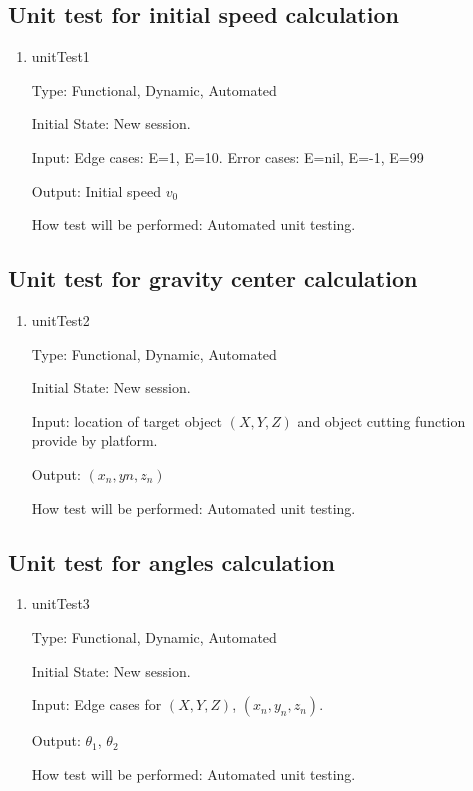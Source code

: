 \documentclass[12pt, titlepage]{article}
\begin{document}
\subsection{Unit test for initial speed calculation}

\begin{enumerate}
	
	\item{unitTest1\\}
	
	Type: Functional, Dynamic, Automated
	
	Initial State: New session.
	
	Input: Edge cases: E=1, E=10.
			Error cases: E=nil, E=-1, E=99
	
	Output: Initial speed $v_{0}$
	
	How test will be performed: Automated unit testing.
	
\end{enumerate}

\subsection{Unit test for gravity center calculation}

\begin{enumerate}
	
	\item{unitTest2\\}
	
	Type: Functional, Dynamic, Automated
	
	Initial State: New session.
	
	Input: location of target object $(X,Y,Z)$ and object cutting function provide by platform. 
	
	Output: $(x_{n},y{n},z_{n})$
	
	How test will be performed: Automated unit testing.
	
\end{enumerate}

\subsection{Unit test for angles calculation}

\begin{enumerate}
	
	\item{unitTest3\\}
	
	Type: Functional, Dynamic, Automated
	
	Initial State: New session.
	
	Input: Edge cases for $(X,Y,Z)$, $(x_{n},y_{n},z_{n})$.
	
	Output: $\theta_{1}$, $\theta_{2}$
	
	How test will be performed: Automated unit testing.
	
\end{enumerate}
\end{document}
